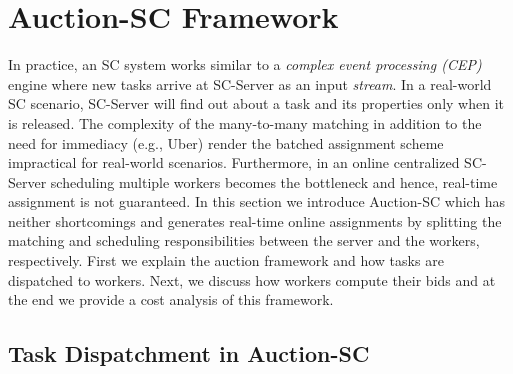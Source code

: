\section{Auction-SC Framework}
\label{sec:onlinealgo}

In practice, an SC system works similar to a \emph{complex event processing (CEP)} engine \cite{Luckham01} where new tasks arrive at SC-Server as an input \textit{stream}. In a real-world SC scenario, SC-Server will find out about a task and its properties only when it is released. The complexity of the many-to-many matching in addition to the need for immediacy (e.g., Uber) render the batched assignment scheme impractical for real-world scenarios. Furthermore, in an online centralized SC-Server scheduling multiple workers becomes the bottleneck and hence, real-time assignment is not guaranteed. In this section we introduce Auction-SC which has neither shortcomings and generates real-time online assignments by splitting the matching and scheduling responsibilities between the server and the workers, respectively. First we explain the auction framework and how tasks are dispatched to workers. Next, we discuss how workers compute their bids and at the end we provide a cost analysis of this framework.

\subsection{Task Dispatchment in Auction-SC}



